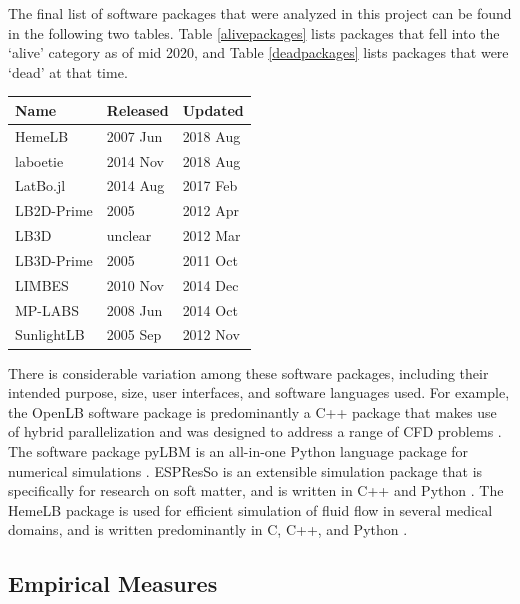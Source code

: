\documentclass[12pt, notitlepage]{article}
\begin{document}
The final list of software packages that were analyzed in this project can be found in the following two tables. Table \ref{alivepackages} lists packages that fell into the `alive' category as of mid 2020, and Table \ref{deadpackages} lists packages that were `dead' at that time. \\

\begin{onehalfspacing}
\begin{center}
	\begin{tabular}{ p{4cm}p{3cm}p{3cm} }
		\hline
		Name & Released & Updated\\
		\hline
		HemeLB & 2007 Jun & 2018 Aug\\
		laboetie & 2014 Nov & 2018 Aug\\		
		LatBo.jl & 2014 Aug & 2017 Feb\\
		LB2D-Prime & 2005 & 2012 Apr\\
		LB3D & unclear & 2012 Mar\\
		LB3D-Prime & 2005 & 2011 Oct\\
		LIMBES & 2010 Nov & 2014 Dec\\
		MP-LABS & 2008 Jun & 2014 Oct\\
		SunlightLB & 2005 Sep & 2012 Nov\\
		\hline
	\end{tabular}
	\label{deadpackages}
\end{center}
\end{onehalfspacing}

There is considerable variation among these software packages, including their intended purpose, size, user interfaces, and software languages used. For example, the OpenLB software package is predominantly a C++ package that makes use of hybrid parallelization and was designed to address a range of CFD problems \citep{heuveline2009towards}. The software package pyLBM is an all-in-one Python language package for numerical simulations \citep{graille2017pylbm}. ESPResSo is an extensible simulation package that is specifically for research on soft matter, and is written in C++ and Python \citep{weik2019espresso}. The HemeLB package is used for efficient simulation of fluid flow in several medical domains, and is written predominantly in C, C++, and Python \citep{mazzeo2008hemelb}. 

\subsection{Empirical Measures}\label{empiricalmeasures}
\end{document}
